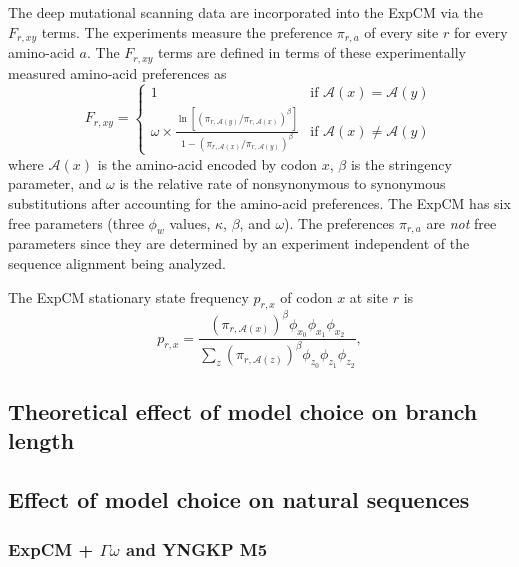 \documentclass[11pt]{article}
\begin{document}
The deep mutational scanning data are incorporated into the ExpCM via the $F_{r,xy}$ terms.
The experiments measure the preference $\pi_{r,a}$ of every site $r$ for every amino-acid $a$.
The $F_{r,xy}$ terms are defined in terms of these experimentally measured amino-acid preferences as
\begin{equation}
\label{eq:Frxy}
F_{r,xy} = 
\begin{cases}
   1 & \mbox{if $\mathcal{A}\left(x\right) = \mathcal{A}\left(y\right)$} \\
   \omega \times \frac{\ln\left[\left(\pi_{r,\mathcal{A}\left(y\right)} / \pi_{r,\mathcal{A}\left(x\right)}\right)^{\beta}\right]}{1 - \left(\pi_{r,\mathcal{A}\left(x\right)} / \pi_{r,\mathcal{A}\left(y\right)}\right)^{\beta}} & \mbox{if $\mathcal{A}\left(x\right) \ne \mathcal{A}\left(y\right)$}
   \end{cases}
\end{equation}
where $\mathcal{A}\left(x\right)$ is the amino-acid encoded by codon $x$, $\beta$ is the stringency parameter, and $\omega$ is the relative rate of nonsynonymous to synonymous substitutions after accounting for the amino-acid preferences.
The ExpCM has six free parameters (three $\phi_w$ values, $\kappa$, $\beta$, and $\omega$).
The preferences $\pi_{r,a}$ are \emph{not} free parameters since they are determined by an experiment independent of the sequence alignment being analyzed.

The ExpCM stationary state frequency $p_{r,x}$ of codon $x$ at site $r$ is~\citep{bloom2017identification} 
\begin{equation}
\label{eq:p_rx}
p_{r,x} = \frac{\left(\pi_{r,\mathcal{A}\left(x\right)}\right)^{\beta} \phi_{x_0} \phi_{x_1} \phi_{x_2}}{\sum_z \left(\pi_{r,\mathcal{A}\left(z\right)}\right)^{\beta} \phi_{z_0} \phi_{z_1} \phi_{z_2}},
\end{equation}
\subsection*{Theoretical effect of model choice on branch length}
\subsection*{Effect of model choice on natural sequences}

\subsubsection*{ExpCM + $\Gamma\omega$ and YNGKP M5}
\end{document}
